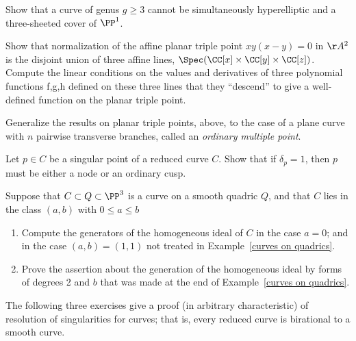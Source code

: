 \begin{exercise}\label{gonality exclusion}
Show that a curve of genus $g \geq 3$ cannot be simultaneously hyperelliptic and a three-sheeted cover of $\PP^1$.
\end{exercise}

\begin{exercise}\label{planar triple pt}
Show that normalization of the affine planar triple point $xy(x-y) = 0$ in $\AA^2$ is the disjoint union of three
affine lines, $\Spec(\CC[x] \times \CC[y]\times \CC[z])$. Compute the linear conditions on the values and derivatives of three polynomial functions f,g,h defined on
these three lines that they ``descend'' to give a well-defined function on the planar triple point.
\end{exercise}

\begin{exercise} Generalize the results on planar triple points, above, to the case of a plane curve with $n$ pairwise
transverse branches, called an \emph{ordinary multiple point}.
\end{exercise}

\begin{exercise}\label{delta=1 characterization}
Let $p \in C$ be a singular point of a reduced curve $C$. Show that if $\delta_p = 1$, then $p$ must be either a node or an ordinary cusp.
\end{exercise}

\begin{exercise}\label{curve on rank 4 quadric}
 Suppose that $C\subset Q\subset \PP^{3}$ is a curve on a smooth quadric $Q$, and that $C$ lies
 in the class $(a,b)$ with $0\leq a\leq b$
 
\begin{enumerate}
 \item Compute the generators of the homogeneous ideal of $C$ in the case $a=0$; and in the case
 $(a,b) = (1,1)$ not treated in Example~\ref{curves on quadrics}.
 \item Prove the assertion about the generation of the homogeneous ideal by forms of degrees 2 and $b$
 that was made at the end of Example~\ref{curves on quadrics}.
\end{enumerate}
\end{exercise}

The following three exercises give a proof (in arbitrary characteristic) of resolution of singularities for curves; that is, every reduced curve is birational to a smooth curve.


